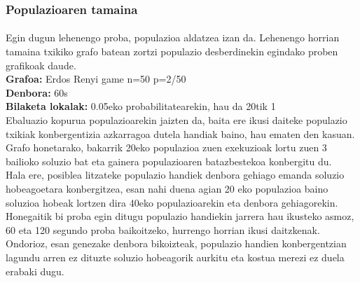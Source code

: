 \documentclass[eu,gi]{ifirak}\usepackage[]{graphicx}\usepackage[]{color}
\begin{document}
\subsubsection{Populazioaren tamaina}
\paragraph{}
Egin dugun lehenengo proba, populazioa aldatzea izan da. Lehenengo horrian tamaina txikiko grafo batean zortzi populazio desberdinekin egindako proben grafikoak daude.\\
\hspace*{1.2cm}\textbf{Grafoa:} Erdos Renyi game n=50 p=2/50\\
\hspace*{1.2cm}\textbf{Denbora:} 60s\\
\hspace*{1.2cm}\textbf{Bilaketa lokalak:} 0.05eko probabilitatearekin, hau da 20tik 1\\
 
Ebaluazio kopurua populazioarekin jaizten da, baita ere ikusi daiteke populazio txikiak konbergentizia azkarragoa dutela handiak baino, hau ematen den kasuan.\\

Grafo honetarako, bakarrik 20eko populazioa zuen exekuzioak lortu zuen 3 bailioko soluzio bat eta gainera populazioaren batazbestekoa konbergitu du.\\

Hala ere, posiblea litzateke populazio handiek denbora gehiago emanda soluzio hobeagoetara konbergitzea, esan nahi duena agian 20 eko populazioa baino soluzioa hobeak lortzen dira 40eko populazioarekin eta denbora gehiagorekin. Honegaitik bi proba egin ditugu populazio handiekin jarrera hau ikusteko asmoz, 60 eta 120 segundo proba baikoitzeko, hurrengo horrian ikusi daitzkenak. Ondorioz, esan genezake denbora bikoizteak, populazio handien konbergentzian lagundu arren ez dituzte soluzio hobeagorik aurkitu eta kostua merezi ez duela erabaki dugu.\\
\end{document}
